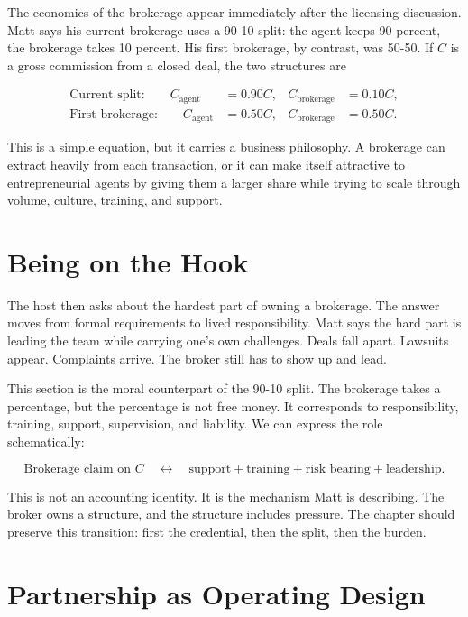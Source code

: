 The economics of the brokerage appear immediately after the licensing discussion. Matt says his current brokerage uses a 90-10 split: the agent keeps 90 percent, the brokerage takes 10 percent. His first brokerage, by contrast, was 50-50. If \(C\) is a gross commission from a closed deal, the two structures are

\begin{align}
\text{Current split:}\qquad
C_{\text{agent}}&=0.90C,
&
C_{\text{brokerage}}&=0.10C,\\
\text{First brokerage:}\qquad
C_{\text{agent}}&=0.50C,
&
C_{\text{brokerage}}&=0.50C.
\end{align}

This is a simple equation, but it carries a business philosophy. A brokerage can extract heavily from each transaction, or it can make itself attractive to entrepreneurial agents by giving them a larger share while trying to scale through volume, culture, training, and support.

\section{Being on the Hook}

The host then asks about the hardest part of owning a brokerage. The answer moves from formal requirements to lived responsibility. Matt says the hard part is leading the team while carrying one's own challenges. Deals fall apart. Lawsuits appear. Complaints arrive. The broker still has to show up and lead.

This section is the moral counterpart of the 90-10 split. The brokerage takes a percentage, but the percentage is not free money. It corresponds to responsibility, training, support, supervision, and liability. We can express the role schematically:

\begin{equation}
\text{Brokerage claim on } C
\quad \longleftrightarrow \quad
\text{support}+\text{training}+\text{risk bearing}+\text{leadership}.
\end{equation}

This is not an accounting identity. It is the mechanism Matt is describing. The broker owns a structure, and the structure includes pressure. The chapter should preserve this transition: first the credential, then the split, then the burden.

\section{Partnership as Operating Design}

